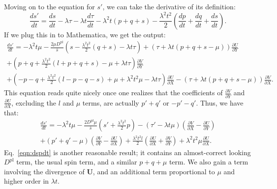\documentclass[11pt]{article}
\newcommand{\p}{\partial}
\newcommand{\bU}{\mathbf{U}}
\newcommand{\Dpl}{D^\text{pl}}
\begin{document}
Moving on to the equation for $s'$, we can take the derivative of its definition:
\begin{equation*}
    \frac{ds'}{dt} = \frac{ds}{dt} - \lambda \tau - \lambda t \frac{d\tau}{dt} - \lambda^2t (p + q + s) - \frac{\lambda^2t^2}{2}\left(\frac{dp}{dt} + \frac{dq}{dt} + \frac{ds}{dt}\right).
\end{equation*}
If we plug this in to Mathematica, we get the output:
\begin{multline*}
    \frac{ds'}{dt} = -\lambda^2t\mu - \frac{2\mu\Dpl}{\bar{s}}\left(s - \frac{\lambda^2t^2}{2}(q+s) - \lambda t\tau\right) + (\tau + \lambda t (p + q + s - \mu))\frac{\p U}{\p Y} \\
    + \left(p + q + \frac{\lambda^2t^2}{2}(l + p + q + s) - \mu + \lambda t\tau\right)\frac{\p V}{\p Y}\\
    + \left(-p -q + \frac{\lambda^2t^2}{2}(l - p - q - s) + \mu + \lambda^2t^2\mu - \lambda t \tau\right)\frac{\p U}{\p X}
    - (\tau + \lambda t (p + q + s - \mu))\frac{\p V}{\p X}.
\end{multline*}
This equation reads quite nicely once one realizes that the coefficients of $\frac{\p V}{\p Y}$ and $\frac{\p U}{\p X}$, excluding the $l$ and $\mu$ terms, are actually $p' + q'$ or $-p'-q'$. Thus, we have that:
\begin{multline}
    \frac{ds'}{dt} = -\lambda^2t\mu - \frac{2\Dpl\mu}{\bar{s}}\left(s' + \frac{\lambda^2t^2}{2}p\right) - (\tau' - \lambda t\mu) \left(\frac{\p V}{\p X} - \frac{\p U}{\p Y}\right)\\
    + (p' + q' - \mu)\left(\frac{\p V}{\p Y} - \frac{\p U}{\p X}\right) + \frac{\lambda^2t^2 l}{2}\left(\frac{\p U}{\p X} + \frac{\p V}{\p Y}\right) + \lambda^2t^2\mu\frac{\p U}{\p X}.
    \label{eqn:dspdt}
\end{multline}
Eq.~\ref{eqn:dspdt} is another reasonable result; it contains an almost-correct looking $\Dpl$ term, the usual spin term, and a similar $p+q+\mu$ term. We also gain a term involving the divergence of $\bU$, and an additional term proportional to $\mu$ and higher order in $\lambda t$.
\end{document}

